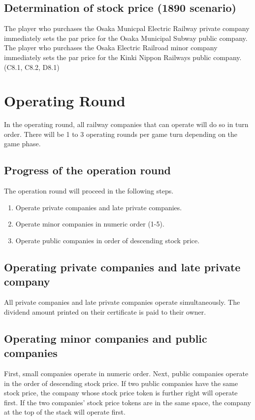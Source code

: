 \documentclass{article}
\begin{document}
\begin{CJK}{UTF8}{min}
\begin{multicols}{2}
\subsection{Determination of stock price (1890 scenario)}
The player who purchases the Osaka Municpal Electric Railway private
company immediately sets the par price for the Osaka Municipal Subway
public company. The player who purchases the Osaka Electric Railroad
minor company immediately sets the par price for the Kinki Nippon
Railways public company. (C8.1, C8.2, D8.1)



\section{Operating Round}
In the operating round, all railway companies that can operate will do
so in turn order. There will be 1 to 3 operating rounds per game turn
depending on the game phase.

\subsection{Progress of the operation round}
The operation round will proceed in the following steps.
\begin{enumerate}
\item Operate private companies and late private companies.
\item Operate minor companies in numeric order (1-5).
\item Operate public companies in order of descending stock price.
\end{enumerate}

\subsection{Operating private companies and late private company}
All private companies and late private companies operate
simultaneously.  The dividend amount printed on their certificate is
paid to their owner.

\subsection{Operating minor companies and public companies}
First, small companies operate in numeric order. Next, public
companies operate in the order of descending stock price. If two
public companies have the same stock price, the company whose stock
price token is further right will operate first. If the two companies'
stock price tokens are in the same space, the company at the top of
the stack will operate first.


\end{multicols}
\end{CJK}
\end{document}
